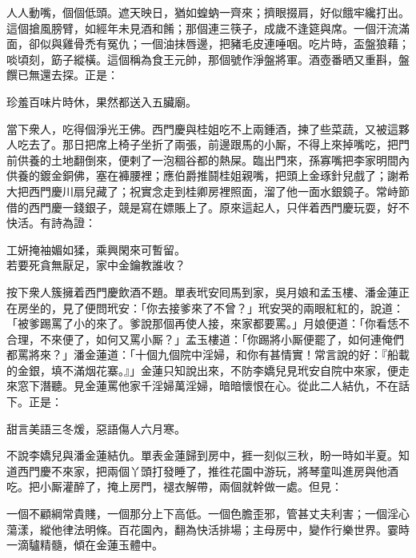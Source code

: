 \begin{myquote}
人人動嘴，個個低頭。遮天映日，猶如蝗蚋一齊來；擠眼掇肩，好似餓牢纔打出。這個搶風膀臂，如經年未見酒和餚；那個連三筷子，成歲不逢筵與席。一個汗流滿面，卻似與雞骨禿有冤仇；一個油抹唇邊，把豬毛皮連唾咽。吃片時，盃盤狼藉；啖頃刻，筯子縱橫。這個稱為食王元帥，那個號作淨盤將軍。酒壺番晒又重斟，盤饌已無還去探。正是：

珍羞百味片時休，果然都送入五臟廟。{}
\end{myquote}

當下衆人，吃得個淨光王佛。西門慶與桂姐吃不上兩鍾酒，揀了些菜蔬，又被這夥人吃去了。那日把席上椅子坐折了兩張，前邊跟馬的小厮，不得上來掉嘴吃，把門前供養的土地翻倒來，便剌了一泡稒谷都的熱屎。{}臨出門來，孫寡嘴把李家明間內供養的鍍金銅佛，塞在褲腰裡；應伯爵推鬪桂姐親嘴，把頭上金琢針兒戲了；謝希大把西門慶川扇兒藏了；祝實念走到桂卿房裡照面，溜了他一面水銀鏡子。常峙節借的西門慶一錢銀子，競是寫在嫖賬上了。原來這起人，只伴着西門慶玩耍，好不快活。有詩為證：

\begin{myquote}
工妍掩袖媚如猱，乘興閑來可暫留。\\若要死貪無厭足，家中金鑰教誰收？
\end{myquote}

按下衆人簇擁着西門慶飲酒不題。單表玳安囘馬到家，吳月娘和孟玉樓、潘金蓮正在房坐的，見了便問玳安：「你去接爹來了不曾？」玳安哭的兩眼紅紅的，說道：「被爹踢罵了小的來了。爹說那個再使人接，來家都要罵。」月娘便道：「你看恁不合理，不來便了，如何又罵小厮？」孟玉樓道：「你踢將小厮便罷了，如何連俺們都罵將來？」潘金蓮道：「十個九個院中淫婦，和你有甚情實！常言說的好：『船載的金銀，填不滿烟花寨。』」金蓮只知說出來，不防李嬌兒見玳安自院中來家，便走來窓下潛聽。見金蓮罵他家千淫婦萬淫婦，暗暗懷恨在心。從此二人結仇，不在話下。正是：

\begin{myquote}
甜言美語三冬煖，惡語傷人六月寒。
\end{myquote}

不說李嬌兒與潘金蓮結仇。單表金蓮歸到房中，捱一刻似三秋，盼一時如半夏。知道西門慶不來家，把兩個丫頭打發睡了，推徃花園中游玩，將琴童叫進房與他酒吃。把小厮灌醉了，{}掩上房門，褪衣解帶，兩個就幹做一處。但見：

\begin{myquote}
一個不顧綱常貴賤，一個那分上下高低。一個色膽歪邪，管甚丈夫利害；一個淫心蕩漾，縱他律法明條。百花園內，翻為快活排場；主母房中，變作行樂世界。霎時一滴驢精髓，{}傾在金蓮玉體中。
\end{myquote}

